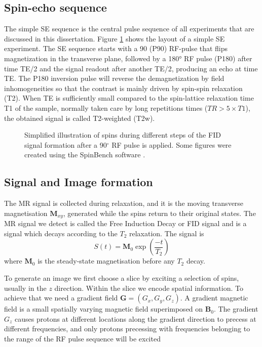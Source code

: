 \subsection*{Spin-echo sequence}
The simple {\gls{SE}} sequence is the central pulse sequence of all experiments that are discussed in this dissertation. Figure \ref{fig:chap2 SE sequence} shows the layout of a simple \gls{SE} experiment. The \gls{SE} sequence starts with a 90 (P90) RF-pulse that flips magnetization in the transverse plane, followed by a 180° RF pulse (P180) after time TE/2 and the signal readout after another TE/2, producing an echo at time TE. The P180 inversion pulse will reverse the demagnetization by field inhomogeneities so that the contrast is mainly driven by spin-spin relaxation (T2). When TE is sufficiently small compared to the spin-lattice relaxation time T1 of the sample, normally taken care by long repetitions times ($TR>5\times T1 $), the obtained signal is called T2-weighted (T2w). 

\begin{figure}[ht]
\centering
{}
\caption{Simplified illustration of spins during different steps of the FID signal formation after a 90$^\circ$ RF pulse is applied. Some figures were created using the SpinBench software \citep{Overall:2007}.}
\label{fig:chap2 SE sequence}
\end{figure}


\subsection*{Signal and Image formation}
The MR signal is collected during relaxation, and it is the moving transverse magnetisation $\textbf{M}_{xy}$, generated while the spins return to their original states. The MR signal we detect is called the Free Induction Decay or FID signal and is a signal which decays according to the $T_{2}$ relaxation. The signal is
\begin{equation}
S(t)= \textbf{M}_{0}\exp(\frac{-t}{T_{2}})
\label{TET2}
\end{equation}
where $\textbf{M}_{0}$ is the steady-state magnetisation before any $T_{2}$ decay.

To generate an image we first choose a slice by exciting a selection of spins, usually in the $z$ direction. Within the slice we encode spatial information.  To achieve that we need a gradient field $\textbf{G}=(G_{x},G_{y},G_{z})$. A gradient magnetic field is a small spatially varying magnetic field superimposed on $\textbf{B}_{0}$. The gradient $G_{z}$ causes protons at different locations along the gradient direction to precess at different frequencies, and only protons precessing with frequencies belonging to the range of the RF pulse sequence will be excited


